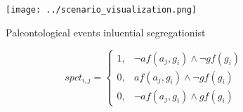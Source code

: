 \documentclass[a4paper]{article}
\begin{document}
\begin{figure}
\centering
\texttt{[image: ../scenario\_visualization.png]}
\caption{Paleontological events inluential segregationist 
}
\end{figure}
 
\begin{equation}
spct_{i,j} =
\begin{cases}
1, & \text{$\neg af(a_j,g_i) \wedge \neg gf(g_i)$}\\
0, & \text{$af(a_j,g_i) \wedge \neg gf(g_i)$}\\
0, & \text{$\neg af(a_j,g_i) \wedge gf(g_i)$}
\end{cases}
\end{equation}
\end{document}
